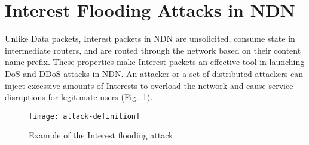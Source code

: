 \section{Interest Flooding Attacks in NDN}
\label{sec:interest-flooding}




Unlike Data packets, Interest packets in NDN are unsolicited, consume state in intermediate routers, and are routed through the network based on their content name prefix. These properties make Interest packets an effective tool in launching DoS and DDoS attacks in NDN. An attacker or a set of distributed attackers can inject excessive amounts of Interests to overload the network and cause service disruptions for legitimate users (Fig.~\ref{fig:flooding example}). 

\begin{figure}[htbp]
  \centering
  \texttt{[image: attack-definition]}
  \vspace{-0.4cm}
  \caption{Example of the Interest flooding attack}
  \label{fig:flooding example}
\end{figure}



